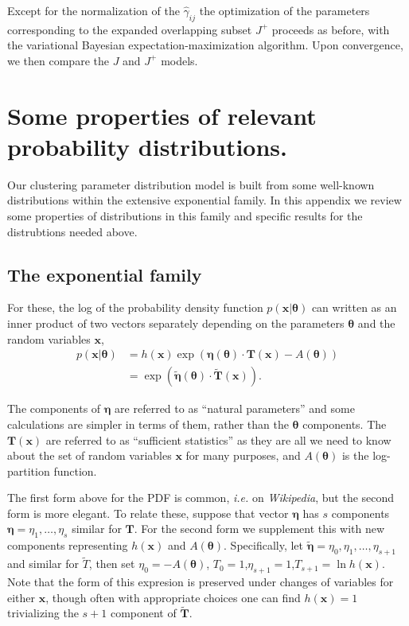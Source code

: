 \documentclass[aps,showpacs,twocolumn,prd,superscriptaddress,nofootinbib]{revtex4}
\begin{document}
Except for the normalization of the $\hat\gamma_{ij}$ the optimization of the parameters corresponding to the expanded overlapping subset $J^+$ proceeds as before, with the variational Bayesian expectation-maximization algorithm.  Upon convergence, we then compare the $J$ and $J^+$ models.





\appendix

\section{Some properties of relevant probability distributions.}
Our clustering parameter distribution model is built from some well-known distributions within the extensive exponential family. In this appendix we review some properties of distributions in this family and specific results for the distrubtions needed above.

\subsection{The exponential family}
For these, the log of the probability density function $p(\bm x|\bm \theta)$ can written as an inner product of two vectors separately depending on the parameters $\bm\theta$ and the random variables $\bm x$,
\begin{align}
p(\bm x|\bm \theta)
&= h(\bm x)\exp{\left( {\bm \eta}({\bm\theta}) \cdot \bm T(\bm x) -A(\bm\theta)\right)}\\
&= \exp{\left( \bm{\tilde\eta}(\bm\theta) \cdot \bm{\tilde T}(\bm x) \right)}.
\end{align}

The components of $\bm\eta$ are referred to as ``natural parameters'' and some calculations are simpler in terms of them, rather than the $\bm\theta$ components.  The $\bm T(\bm x)$ are referred to as ``sufficient statistics'' as they are all we need to know about the set of random variables $\bm x$ for many purposes, and $A(\bm\theta)$ is the log-partition function. 

The first form above for the PDF is common, {\it i.e.} on
{\it Wikipedia}, but the second form is more elegant.  To relate
these, suppose that vector $\bm\eta$ has $s$ components
$\bm\eta={\eta_1,\ldots,\eta_s}$ similar for $\bm T$.  For the
second form we supplement this with new components representing
$h({\bm x})$ and $A({\bm\theta})$. Specifically, let
$\bm{\tilde\eta}={\eta_0,\eta_1,\ldots,\eta_{s+1}}$ and similar
for $\tilde T$, then set $\eta_0=-A(\bm\theta)$,
$T_0=1$,$\eta_{s+1}=1$,$T_{s+1}=\ln{h(\bm x)}$.  Note that the
form of this expresion is preserved under changes of variables for
either $\bm x$, though often with appropriate choices one can find
$h(\bm x)=1$ trivializing the $s+1$ component of $\bm{\tilde  T}$.
\end{document}
